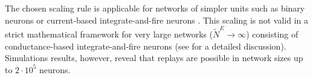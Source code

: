     The chosen scaling rule is applicable for networks of simpler units such as
    binary neurons or current-based integrate-and-fire neurons \citep{Amit1997,
    vanVreeswijk1998}. This scaling is not valid in a strict mathematical
    framework for very large networks ($\widetilde{N}^E \rightarrow \infty$)
    consisting of conductance-based integrate-and-fire neurons (see
    \cite{Renart2007} for a detailed discussion). Simulations results, however,
    reveal that replays are possible in network sizes up to $2 \cdot 10^5$
    neurons.
